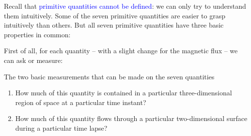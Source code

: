 \documentclass[a4paper,12pt,%
onecolumn,oneside,%
british%
]{memoir}
\renewcommand*{\|}[1][]{\nonscript\:#1\vert\nonscript\:\mathopen{}}
\newcommand*{\sect}{\S}%
\renewcommand*{\autoref}[2]{\sidepar{\vspace{-1ex}\footnotesize{\color{blue}\faIcon{%
angle-right%
}\enspace\sect~\ref{#1} page~\pageref{#1}}}\textcolor{blue}{#2}}
\begin{document}
\medskip

Recall that \autoref{sec:primitives}{primitive quantities cannot be defined}: we can only try to understand them intuitively. Some of the seven primitive quantities are easier to grasp intuitively than others. But all seven primitive quantities have three basic properties in common:

First of all, for each quantity -- with a slight change for the magnetic flux -- we can ask or measure:
\begin{definition}{The two basic measurements that can be made on the seven quantities}
  \begin{enumerate}[label=\arabic*.]\bfseries
  \item How much of this quantity is contained in a particular three-dimensional region of space at a particular time instant?

  \item How much of this quantity flows through a particular two-dimensional surface during a particular time lapse?
  \end{enumerate}
\end{definition}
%
\end{document}

